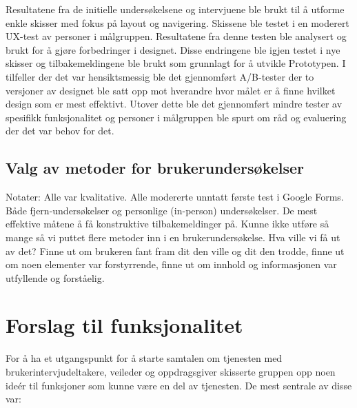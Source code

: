 Resultatene fra de initielle undersøkelsene og intervjuene ble brukt til å utforme enkle skisser med fokus på layout og navigering. Skissene ble testet i en moderert UX-test av personer i målgruppen. Resultatene fra denne testen ble analysert og brukt for å gjøre forbedringer i designet. Disse endringene ble igjen testet i nye skisser og tilbakemeldingene ble brukt som grunnlagt for å utvikle Prototypen. I tilfeller der det var hensiktsmessig ble det gjennomført A/B-tester der to versjoner av designet ble satt opp mot hverandre hvor målet er å finne hvilket design som er mest effektivt. Utover dette ble det gjennomført mindre tester av spesifikk funksjonalitet og personer i målgruppen ble spurt om råd og evaluering der det var behov for det.

\subsection{Valg av metoder for brukerundersøkelser}
Notater:
Alle var kvalitative.
Alle modererte unntatt første test i Google Forms.
Både fjern-undersøkelser og personlige (in-person) undersøkelser.
De mest effektive måtene å få konstruktive tilbakemeldinger på.
Kunne ikke utføre så mange så vi puttet flere metoder inn i en brukerundersøkelse.
Hva ville vi få ut av det? Finne ut om brukeren fant fram dit den ville og dit den trodde, finne ut om noen elementer var forstyrrende, finne ut om innhold og informasjonen var utfyllende og forståelig.

\section{Forslag til funksjonalitet}
\label{section:funkForslag}
For å ha et utgangspunkt for å starte samtalen om tjenesten med brukerintervjudeltakere, veileder og oppdragsgiver skisserte gruppen opp noen ideér til funksjoner som kunne være en del av tjenesten. De mest sentrale av disse var:%

